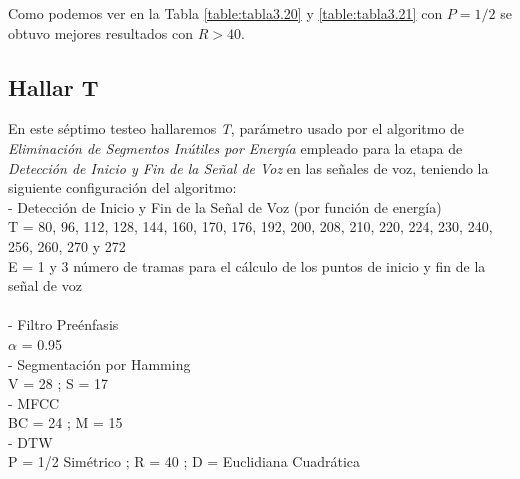 \vskip -0.5cm
Como podemos ver en la Tabla \ref{table:tabla3.20} y \ref{table:tabla3.21} con $P = 1/2$ se obtuvo mejores resultados con $R > 40$.

\subsection{Hallar T}
En este séptimo testeo hallaremos \textit{T}, parámetro usado por el algoritmo de \textit{Eliminación de Segmentos Inútiles por Energía} empleado para la etapa de \textit{Detección de Inicio y Fin de la Señal de Voz} en las señales de voz, teniendo la siguiente configuración del algoritmo: \\
- Detección de Inicio y Fin de la Señal de Voz (por función de energía) \\
\hspace*{1cm} T = 80, 96, 112, 128, 144, 160, 170, 176, 192, 200, 208, 210, 220, 224, 230, 240, 256, 260, 270 y 272 \\
\hspace*{1cm} E = 1 y 3 número de tramas para el cálculo de los puntos de inicio y fin de la señal de voz \\ \\
- Filtro Preénfasis \\
\hspace*{1cm} $\alpha$ = 0.95 \\
- Segmentación por Hamming \\
\hspace*{1cm} V = 28 ; \qquad S = 17 \\
- MFCC \\
\hspace*{1cm} BC = 24 ; \qquad M = 15 \\
- DTW \\
\hspace*{1cm} P = 1/2 Simétrico ; \qquad R = 40 ; \qquad D = Euclidiana Cuadrática 

